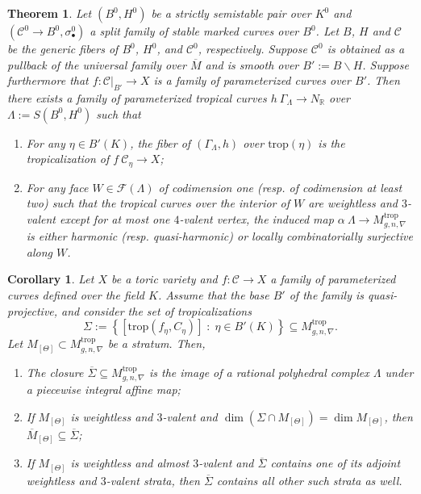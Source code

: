 \documentclass[10pt,a4paper]{amsart}
\newtheorem{thm}{Theorem}
\newtheorem{cor}{Corollary}
\newcommand{\CF}{{\mathcal F}}
\newcommand{\RR}{{\mathbb R}}
\newcommand{\cC}{{\mathcal{C}}}
\newcommand{\com}[1]{{\color{brown}$\textsuperscript{+}$\marginnote{\small #1}}}
\newcommand{\trop}{\mathrm{trop}}
\begin{document}
\begin{thm}\label{thm:main thm}
Let $(B^0,H^0)$ be a strictly semistable pair over $K^0$ and $(\cC^0\rightarrow B^0,\sigma^0_\bullet)$ a split family of stable marked curves over $B^0$. Let $B$, $H$ and $\cC$ be the generic fibers of $B^0$, $H^0$, and $\cC^0$, respectively. Suppose $\cC^0$ is obtained as a pullback of the universal family over $\overline M$ and is smooth over $B':=B\backslash H$. Suppose furthermore that $f \colon \cC|_{B'} \rightarrow X$ is a family of parameterized curves over $B'$. Then there exists a family of parameterized tropical curves $h\: \Gamma_\Lambda\to N_\RR$ over $\Lambda:=S(B^0,H^0)$ such that 
\begin{enumerate}
\item For any $\eta \in B'(K)$, the fiber of $(\Gamma_\Lambda, h)$ over $\trop(\eta)$ is the tropicalization of $f\:\cC_\eta\to X$;%
\item For any face $W\in\CF(\Lambda)$ of codimension one (resp. of codimension at least two) such that the tropical curves over the interior of $W$ are weightless and $3$-valent except for at most one $4$-valent vertex, 
the induced map $\alpha\:\Lambda\to M^{\trop}_{g,n,\nabla}$ is either harmonic (resp. quasi-harmonic) or locally combinatorially surjective along $W$.
\end{enumerate}
\end{thm}

\begin{cor} \label{cor:main}
Let $X$ be a toric variety and $f\colon \cC \rightarrow X$ a family of parameterized curves defined over the field $K$. Assume that the base $B'$ of the family is quasi-projective, and consider the set of tropicalizations
$$\Sigma:=\left\{\left[ \trop(f_\eta, C_\eta)\right]\; :\; \eta\in B'(K) \right\}\subseteq M^{\trop}_{g,n,\nabla}.$$
Let $M_{[\Theta]}\subset M^{\trop}_{g,n,\nabla}$ be a stratum. Then,
\begin{enumerate}
\item The closure $\overline\Sigma\subseteq M^{\trop}_{g,n,\nabla}$ is the image of a rational polyhedral complex $\Lambda$ under a piecewise integral affine map;
\item If $M_{[\Theta]}$ is weightless and $3$-valent and $\dim(\Sigma\cap M_{[\Theta]})=\dim M_{[\Theta]}$, then $\overline M_{[\Theta]}\subseteq \overline{\Sigma}$;
\item If $M_{[\Theta]}$ is weightless and almost $3$-valent and $\overline{\Sigma}$ contains one of its adjoint weightless and $3$-valent strata, then $\overline{\Sigma}$ contains all other such strata as well. 
\end{enumerate}
\end{cor}
\end{document}
